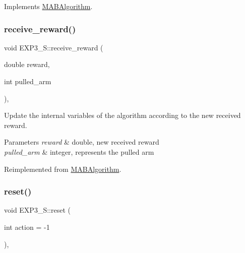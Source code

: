 Implements \mbox{\hyperlink{class_m_a_b_algorithm_afb48f01df0e1860d19759f6e20335007}{M\+A\+B\+Algorithm}}.

\mbox{\label{class_e_x_p3___s_a93cef92a4f0213f7d247768b610071ad}} 
\subsubsection{\texorpdfstring{receive\+\_\+reward()}{receive\_reward()}}
{\footnotesize\ttfamily void E\+X\+P3\+\_\+\+S\+::receive\+\_\+reward (\begin{DoxyParamCaption}\item[{double}]{reward,  }\item[{int}]{pulled\+\_\+arm }\end{DoxyParamCaption})\hspace{0.3cm}{\ttfamily [override]}, {\ttfamily [virtual]}}



Update the internal variables of the algorithm according to the new received reward. 


\begin{DoxyParams}{Parameters}
{\em reward} & double, new received reward \\
\hline
{\em pulled\+\_\+arm} & integer, represents the pulled arm \\
\hline
\end{DoxyParams}


Reimplemented from \mbox{\hyperlink{class_m_a_b_algorithm_aa584b3d6b86fa050e3389be9781b5782}{M\+A\+B\+Algorithm}}.

\mbox{\label{class_e_x_p3___s_a70bfd4fc19a73ab7d2903672c36b2765}} 
\subsubsection{\texorpdfstring{reset()}{reset()}}
{\footnotesize\ttfamily void E\+X\+P3\+\_\+\+S\+::reset (\begin{DoxyParamCaption}\item[{int}]{action = {\ttfamily -\/1} }\end{DoxyParamCaption})\hspace{0.3cm}{\ttfamily [override]}, {\ttfamily [virtual]}}




